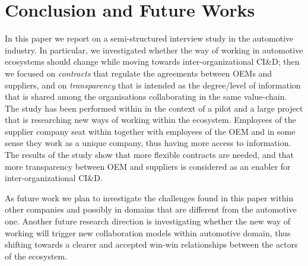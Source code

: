\section{Conclusion and Future Works}\label{sec:conclusion}

In this paper %
we report on a semi-structured interview study in the automotive industry. In particular, %
we investigated whether the way of working in automotive ecosystems should change while moving towards inter-organizational CI\&D; then we focused on {\em contracts} that regulate the agreements between OEMs and suppliers, and   
on {\em transparency} that is intended as the degree/level of information that is shared among the organisations collaborating in the same value-chain. %
The study has been performed within \company{} in the context of a pilot and a large project that is researching new ways of working within the ecosystem. Employees of the supplier company seat within \company{} together with employees of the OEM and in some sense they work as a unique company, thus having more access to information. 
The results of the study show that more flexible contracts are needed, and that more transparency between OEM and suppliers is considered as an enabler for inter-organizational CI\&D. 

As future work we plan to investigate the challenges found in this paper within other companies and possibly in domains that are different from the automotive one. Another future research direction is investigating whether the new way of working will trigger new collaboration models within automotive domain, thus shifting towards a clearer and accepted win-win relationships between the actors of the ecosystem.